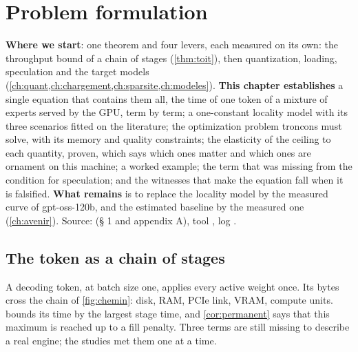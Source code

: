 \chapter{Problem formulation}\label{ch:formulation}

\begin{origine}
\textbf{Where we start}: one theorem and four levers, each measured on its own: the throughput bound of a chain of stages (\cref{thm:toit}), then quantization, loading, speculation and the target models (\cref{ch:quant,ch:chargement,ch:sparsite,ch:modeles}).
\textbf{This chapter establishes} a single equation that contains them all, the time of one token of a mixture of experts served by the GPU, term by term; a one-constant locality model with its three scenarios fitted on the literature; the optimization problem troncons must solve, with its memory and quality constraints; the elasticity of the ceiling to each quantity, proven, which says which ones matter and which ones are ornament on this machine; a worked example; the term that was missing from the condition for speculation; and the witnesses that make the equation fall when it is falsified.
\textbf{What remains} is to replace the locality model by the measured curve of gpt-oss-120b, and the estimated baseline by the measured one (\cref{ch:avenir}).
Source:  (§ 1 and appendix A), tool , log .
\end{origine}

\section{The token as a chain of stages}\label{sec:jeton-chaine}

A decoding token, at batch size one, applies every active weight once. Its bytes cross the chain of \cref{fig:chemin}: disk, RAM, PCIe link, VRAM, compute units.  bounds its time by the largest stage time, and \cref{cor:permanent} says that this maximum is reached up to a fill penalty. Three terms are still missing to describe a real engine; the studies met them one at a time.

